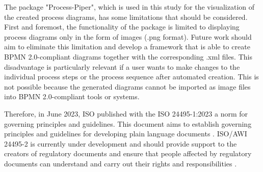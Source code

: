 The package "Process-Piper", which is used in this study for the visualization of the created process diagrams, has some limitations that should be considered. First and foremost, the functionality of the package is limited to displaying process diagrams only in the form of images (.png format).  Future work should aim to eliminate this limitation and develop a framework that is able to create BPMN 2.0-compliant diagrams together with the corresponding .xml files.  This disadvantage is particularly relevant if a user wants to make changes to the individual process steps or the process sequence after automated creation. This is not possible because the generated diagrams cannot be imported as image files into BPMN 2.0-compliant tools or systems.




Therefore, in June 2023, ISO published with the ISO 24495-1:2023 a norm for governing principles and guidelines. This document aims to establish governing principles and guidelines for developing plain language documents \cite{isoISO24495120232020}. ISO/AWI 24495-2 is currently under development and should provide support to the creators of regulatory documents and  ensure that people affected by regulatory documents can understand and carry out their rights and responsibilities \cite{isoISOAWI244952}.